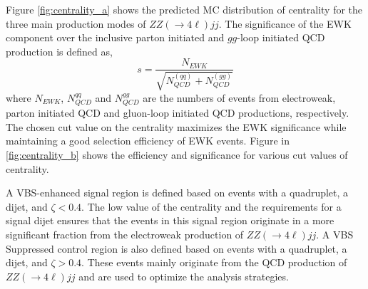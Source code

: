Figure \ref{fig:centrality_a} shows the predicted MC distribution of centrality for the three main production modes of $ZZ(\rightarrow 4 \ell)jj$. The significance of the EWK component over the inclusive parton initiated and $gg$-loop initiated QCD production is defined as, 
\begin{equation}
    s=\frac{N_{EWK}}{\sqrt{N_{QCD}^{(qq)}+N_{QCD}^{(gg)}}}
    \label{eqn:EWKSignificance}
\end{equation}
where $N_{EWK}$, $N_{QCD}^{qq}$ and $N_{QCD}^{gg}$ are the numbers of events from electroweak, parton initiated QCD and gluon-loop initiated QCD productions, respectively. The chosen cut value on the centrality maximizes the EWK significance while maintaining a good selection efficiency of EWK events. Figure in \ref{fig:centrality_b} shows the efficiency and significance for various cut values of centrality.  

A VBS-enhanced signal region is defined based on events with a quadruplet, a dijet, and $\zeta<0.4$. The low value of the centrality and the requirements for a signal dijet ensures that the events in this signal region originate in a more significant fraction from the electroweak production of $ZZ (\rightarrow 4 \ell) jj$. A VBS Suppressed control region is also defined based on events with a quadruplet, a dijet, and $\zeta>0.4$. These events mainly originate from the QCD production of $ZZ (\rightarrow 4 \ell) jj$ and are used to optimize the analysis strategies.

